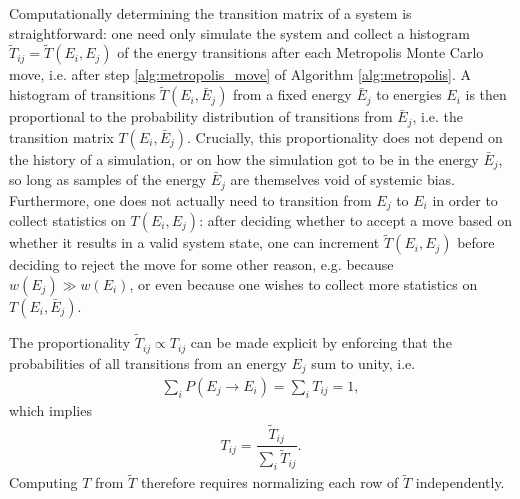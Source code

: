 \documentclass[11pt]{article}
\newcommand{\f}[2]{\dfrac{#1}{#2}} %
\newcommand{\p}[1]{\left(#1\right)} %
\begin{document}
Computationally determining the transition matrix of a system is
straightforward: one need only simulate the system and collect a
histogram $\tilde T_{ij}=\tilde T\p{E_i,E_j}$ of the energy
transitions after each Metropolis Monte Carlo move, i.e. after step
\ref{alg:metropolis_move} of Algorithm \ref{alg:metropolis}. A
histogram of transitions $\tilde T\p{E_i,\bar E_j}$ from a fixed
energy $\bar E_j$ to energies $E_i$ is then proportional to the
probability distribution of transitions from $\bar E_j$, i.e. the
transition matrix $T\p{E_i,\bar E_j}$. Crucially, this proportionality
does not depend on the history of a simulation, or on how the
simulation got to be in the energy $\bar E_j$, so long as samples of
the energy $\bar E_j$ are themselves void of systemic
bias. Furthermore, one does not actually need to transition from $E_j$
to $E_i$ in order to collect statistics on $T\p{E_i,E_j}$: after
deciding whether to accept a move based on whether it results in a
valid system state, one can increment $\tilde T\p{E_i,E_j}$ before
deciding to reject the move for some other reason, e.g. because
$w\p{E_j}\gg w\p{E_i}$, or even because one wishes to collect more
statistics on $T\p{E_i,\bar E_j}$.

The proportionality $\tilde T_{ij}\propto T_{ij}$ can be made explicit
by enforcing that the probabilities of all transitions from an energy
$E_j$ sum to unity, i.e.
\begin{align}
  \sum_iP\p{E_j\to E_i}=\sum_iT_{ij}=1,
  \label{eq:transition_norm_condition}
\end{align}
which implies
\begin{align}
  T_{ij}=\f{\tilde T_{ij}}{\sum_i\tilde T_{ij}}.
  \label{eq:transition_normalization}
\end{align}
Computing $T$ from $\tilde T$ therefore requires normalizing each row
of $\tilde T$ independently.
\end{document}
